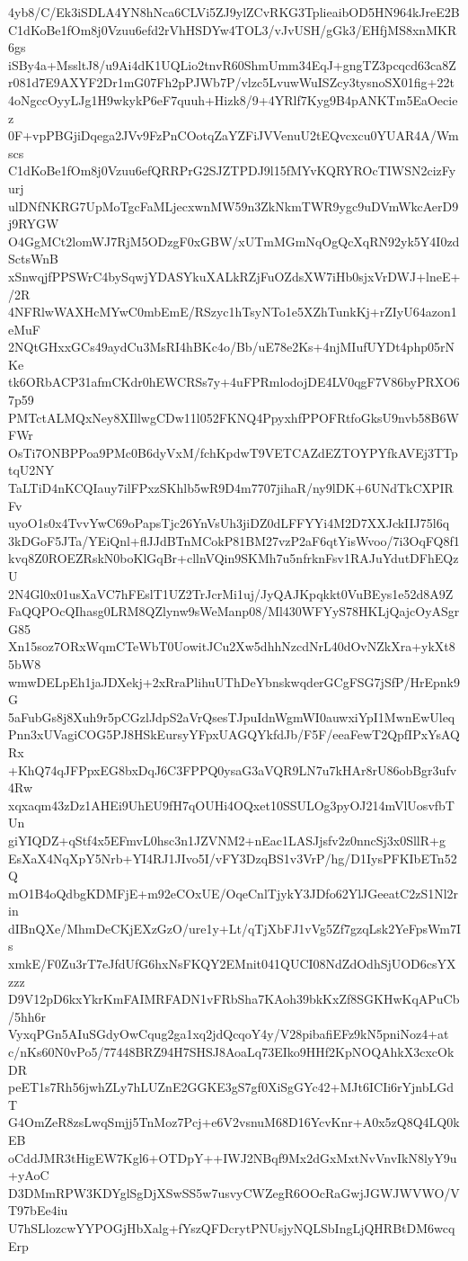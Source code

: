 4yb8/C/Ek3iSDLA4YN8hNca6CLVi5ZJ9ylZCvRKG3TplieaibOD5HN964kJreE2B
C1dKoBe1fOm8j0Vzuu6efd2rVhHSDYw4TOL3/vJvUSH/gGk3/EHfjMS8xnMKR6gs
iSBy4a+MssltJ8/u9Ai4dK1UQLio2tnvR60ShmUmm34EqJ+gngTZ3pcqcd63ca8Z
r081d7E9AXYF2Dr1mG07Fh2pPJWb7P/vlzc5LvuwWuISZcy3tysnoSX01fig+22t
4oNgccOyyLJg1H9wkykP6eF7quuh+Hizk8/9+4YRlf7Kyg9B4pANKTm5EaOeciez
0F+vpPBGjiDqega2JVv9FzPnCOotqZaYZFiJVVenuU2tEQvcxcu0YUAR4A/Wmscs
C1dKoBe1fOm8j0Vzuu6efQRRPrG2SJZTPDJ9l15fMYvKQRYROcTIWSN2cizFyurj
ulDNfNKRG7UpMoTgcFaMLjecxwnMW59n3ZkNkmTWR9ygc9uDVmWkcAerD9j9RYGW
O4GgMCt2lomWJ7RjM5ODzgF0xGBW/xUTmMGmNqOgQcXqRN92yk5Y4I0zdSctsWnB
xSnwqjfPPSWrC4bySqwjYDASYkuXALkRZjFuOZdsXW7iHb0sjxVrDWJ+lneE+/2R
4NFRlwWAXHcMYwC0mbEmE/RSzyc1hTsyNTo1e5XZhTunkKj+rZIyU64azon1eMuF
2NQtGHxxGCs49aydCu3MsRI4hBKc4o/Bb/uE78e2Ks+4njMIufUYDt4php05rNKe
tk6ORbACP31afmCKdr0hEWCRSs7y+4uFPRmlodojDE4LV0qgF7V86byPRXO67p59
PMTctALMQxNey8XIllwgCDw11l052FKNQ4PpyxhfPPOFRtfoGksU9nvb58B6WFWr
OsTi7ONBPPoa9PMc0B6dyVxM/fchKpdwT9VETCAZdEZTOYPYfkAVEj3TTptqU2NY
TaLTiD4nKCQIauy7ilFPxzSKhlb5wR9D4m7707jihaR/ny9lDK+6UNdTkCXPIRFv
uyoO1s0x4TvvYwC69oPapsTjc26YnVsUh3jiDZ0dLFFYYi4M2D7XXJckIIJ75l6q
3kDGoF5JTa/YEiQnl+flJJdBTnMCokP81BM27vzP2aF6qtYisWvoo/7i3OqFQ8f1
kvq8Z0ROEZRskN0boKlGqBr+cllnVQin9SKMh7u5nfrknFsv1RAJuYdutDFhEQzU
2N4Gl0x01usXaVC7hFEslT1UZ2TrJcrMi1uj/JyQAJKpqkkt0VuBEys1e52d8A9Z
FaQQPOcQIhasg0LRM8QZlynw9sWeManp08/Ml430WFYyS78HKLjQajcOyASgrG85
Xn15soz7ORxWqmCTeWbT0UowitJCu2Xw5dhhNzcdNrL40dOvNZkXra+ykXt85bW8
wmwDELpEh1jaJDXekj+2xRraPlihuUThDeYbnskwqderGCgFSG7jSfP/HrEpnk9G
5aFubGs8j8Xuh9r5pCGzlJdpS2aVrQsesTJpuIdnWgmWI0auwxiYpI1MwnEwUleq
Pnn3xUVagiCOG5PJ8HSkEursyYFpxUAGQYkfdJb/F5F/eeaFewT2QpfIPxYsAQRx
+KhQ74qJFPpxEG8bxDqJ6C3FPPQ0ysaG3aVQR9LN7u7kHAr8rU86obBgr3ufv4Rw
xqxaqm43zDz1AHEi9UhEU9fH7qOUHi4OQxet10SSULOg3pyOJ214mVlUosvfbTUn
giYIQDZ+qStf4x5EFmvL0hsc3n1JZVNM2+nEac1LASJjsfv2z0nncSj3x0SllR+g
EsXaX4NqXpY5Nrb+YI4RJ1JIvo5I/vFY3DzqBS1v3VrP/hg/D1IysPFKIbETn52Q
mO1B4oQdbgKDMFjE+m92eCOxUE/OqeCnlTjykY3JDfo62YlJGeeatC2zS1Nl2rin
dIBnQXe/MhmDeCKjEXzGzO/ure1y+Lt/qTjXbFJ1vVg5Zf7gzqLsk2YeFpsWm7Is
xmkE/F0Zu3rT7eJfdUfG6hxNsFKQY2EMnit041QUCI08NdZdOdhSjUOD6csYXzzz
D9V12pD6kxYkrKmFAIMRFADN1vFRbSha7KAoh39bkKxZf8SGKHwKqAPuCb/5hh6r
VyxqPGn5AIuSGdyOwCqug2ga1xq2jdQcqoY4y/V28pibafiEFz9kN5pniNoz4+at
c/nKs60N0vPo5/77448BRZ94H7SHSJ8AoaLq73EIko9HHf2KpNOQAhkX3cxcOkDR
peET1s7Rh56jwhZLy7hLUZnE2GGKE3gS7gf0XiSgGYc42+MJt6ICIi6rYjnbLGdT
G4OmZeR8zsLwqSmjj5TnMoz7Pcj+e6V2vsnuM68D16YcvKnr+A0x5zQ8Q4LQ0kEB
oCddJMR3tHigEW7Kgl6+OTDpY++IWJ2NBqf9Mx2dGxMxtNvVnvIkN8lyY9u+yAoC
D3DMmRPW3KDYglSgDjXSwSS5w7usvyCWZegR6OOcRaGwjJGWJWVWO/VT97bEe4iu
U7hSLlozcwYYPOGjHbXalg+fYszQFDcrytPNUsjyNQLSbIngLjQHRBtDM6wcqErp
